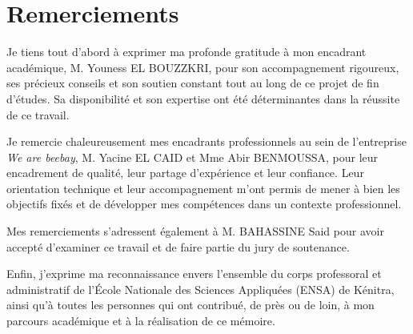 \chapter*{Remerciements}

\vspace{1cm}

Je tiens tout d'abord à exprimer ma profonde gratitude à mon encadrant académique, M. Youness EL BOUZZKRI, pour son accompagnement rigoureux, ses précieux conseils et son soutien constant tout au long de ce projet de fin d'études. Sa disponibilité et son expertise ont été déterminantes dans la réussite de ce travail.

Je remercie chaleureusement mes encadrants professionnels au sein de l'entreprise \textit{We are beebay}, M. Yacine EL CAID et Mme Abir BENMOUSSA, pour leur encadrement de qualité, leur partage d'expérience et leur confiance. Leur orientation technique et leur accompagnement m'ont permis de mener à bien les objectifs fixés et de développer mes compétences dans un contexte professionnel.

Mes remerciements s'adressent également à M. BAHASSINE Said pour avoir accepté d'examiner ce travail et de faire partie du jury de soutenance.

Enfin, j'exprime ma reconnaissance envers l'ensemble du corps professoral et administratif de l'École Nationale des Sciences Appliquées (ENSA) de Kénitra, ainsi qu'à toutes les personnes qui ont contribué, de près ou de loin, à mon parcours académique et à la réalisation de ce mémoire.
